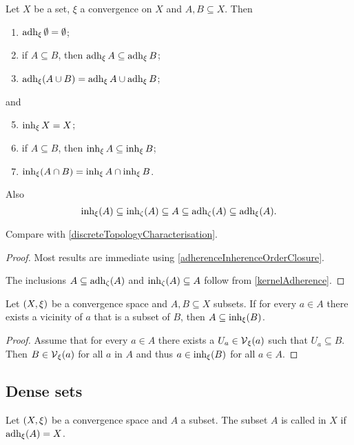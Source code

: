 \begin{corollary} \label{principalInherenceAdherenceProperties}
Let $X$ be a set, $\xi$ a convergence on $X$ and $A,B \subseteq X$. Then
\begin{enumerate}
\item $\operatorname{adh}_\xi \emptyset = \emptyset$;
\item if $A \subseteq B$, then $\operatorname{adh}_\xi A \subseteq \operatorname{adh}_\xi B$;
\item $\operatorname{adh}_\xi(A\cup B) = \operatorname{adh}_\xi A \cup \operatorname{adh}_\xi B$;
\end{enumerate}
and
\begin{enumerate} \setcounter{enumi}{4}
\item $\operatorname{inh}_\xi X = X$;
\item if $A \subseteq B$, then $\operatorname{inh}_\xi A \subseteq \operatorname{inh}_\xi B$;
\item $\operatorname{inh}_\xi(A\cap B) = \operatorname{inh}_\xi A \cap \operatorname{inh}_\xi B$.
\end{enumerate}
Also
\[ \operatorname{inh}_\xi(A) \subseteq \operatorname{inh}_\zeta(A) \subseteq A \subseteq \operatorname{adh}_\zeta(A) \subseteq \operatorname{adh}_\xi(A). \]
\end{corollary}
Compare with \ref{discreteTopologyCharacterisation}.
\begin{proof}
Most results are immediate using \ref{adherenceInherenceOrderClosure}.

The inclusions $A \subseteq \operatorname{adh}_\zeta(A)$ and $\operatorname{inh}_\zeta(A) \subseteq A$ follow from \ref{kernelAdherence}.
\end{proof}


\begin{lemma} \label{subsetWithVicinitiesInInherence}
Let $\left( X,\xi \right)$ be a convergence space and $A,B\subseteq X$ subsets. If for every $a\in A$ there exists a vicinity of $a$ that is a subset of $B$, then $A\subseteq \operatorname{inh}_\xi(B)$.
\end{lemma}
\begin{proof}
Assume that for every $a\in A$ there exists a $U_a \in \operatorname{\mathcal{V}}_\xi(a)$ such that $U_a \subseteq B$. Then $B\in \operatorname{\mathcal{V}}_\xi(a)$ for all $a$ in $A$ and thus $a\in \operatorname{inh}_\xi(B)$ for all $a\in A$.
\end{proof}


\subsection{Dense sets}
\begin{definition}
Let $\left( X, \xi \right)$ be a convergence space and $A$ a subset. The subset $A$ is called  in $X$ if $\operatorname{adh}_\xi(A) = X$.
\end{definition}

